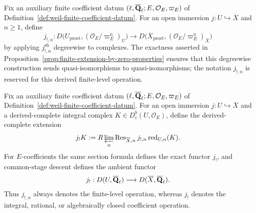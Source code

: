 
\begin{definition}
\label{def:finite-derived-extension-by-zero}


Fix an auxiliary finite coefficient datum
\((\ell,\overline{\mathbf Q}_\ell;E,\mathcal O_E,\varpi_E)\) of
Definition~\ref{def:weil-finite-coefficient-datum}.
For an open immersion \(j:U\hookrightarrow\overline X\) and \(n\geq1\),
define
\[
 j_{!,n}:D\bigl(U_{\mathrm{proet}},(\mathcal O_E/\varpi_E^n)_U\bigr)
 \longrightarrow
 D\bigl(\overline X_{\mathrm{proet}},
          (\mathcal O_E/\varpi_E^n)_{\overline X}\bigr)
\]
by applying \(j^{\mathrm{sh}}_{!,n}\) degreewise to complexes.  The exactness
asserted in Proposition~\ref{prop:finite-extension-by-zero-properties}
ensures that this degreewise construction sends quasi-isomorphisms to
quasi-isomorphisms; the notation \(j_{!,n}\) is reserved for this derived
finite-level operation.
\end{definition}


\begin{definition}
\label{def:extension-by-zero}


Fix an auxiliary finite coefficient datum
\((\ell,\overline{\mathbf Q}_\ell;E,\mathcal O_E,\varpi_E)\) of
Definition~\ref{def:weil-finite-coefficient-datum}.
For an open immersion \(j:U\hookrightarrow\overline X\) and a
derived-complete integral complex
\(K\in D^b_c(U,\mathcal O_E)\), define the
derived-complete extension
\[
 j_!K:=R\varprojlim_n\operatorname{Res}_{\overline X,n}
 j_{!,n}\operatorname{red}_{U,n}(K).
\]
For \(E\)-coefficients the same section formula defines the exact functor
\(j_!\), and common-stage descent defines the ambient functor
\[
 j_!:D(U,\overline{\mathbf Q}_\ell)\longrightarrow D(\overline X,\overline{\mathbf Q}_\ell).
\]
Thus \(j_{!,n}\) always denotes the finite-level
operation, whereas \(j_!\) denotes the integral, rational, or
algebraically closed coefficient operation.
\end{definition}

